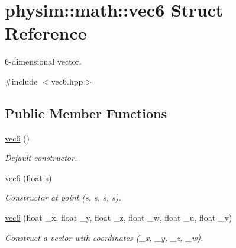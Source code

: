 \hypertarget{structphysim_1_1math_1_1vec6}{}\section{physim\+:\+:math\+:\+:vec6 Struct Reference}
\label{structphysim_1_1math_1_1vec6}


6-\/dimensional vector.  




{\ttfamily \#include $<$vec6.\+hpp$>$}

\subsection*{Public Member Functions}
\begin{DoxyCompactItemize}
\item 
\mbox{\label{structphysim_1_1math_1_1vec6_a94ae3ab411cd831ded39714a1b5a7f34}} 
\hyperlink{structphysim_1_1math_1_1vec6_a94ae3ab411cd831ded39714a1b5a7f34}{vec6} ()
\begin{DoxyCompactList}\small\item\em Default constructor. \end{DoxyCompactList}\item 
\mbox{\label{structphysim_1_1math_1_1vec6_a56e639bc621129c8f06d6f9ca2ac6d97}} 
\hyperlink{structphysim_1_1math_1_1vec6_a56e639bc621129c8f06d6f9ca2ac6d97}{vec6} (float s)
\begin{DoxyCompactList}\small\item\em Constructor at point ({\itshape s}, {\itshape s}, {\itshape s}, {\itshape s}). \end{DoxyCompactList}\item 
\mbox{\label{structphysim_1_1math_1_1vec6_a9fb7628762baef86b9683c0957215b2d}} 
\hyperlink{structphysim_1_1math_1_1vec6_a9fb7628762baef86b9683c0957215b2d}{vec6} (float \+\_\+x, float \+\_\+y, float \+\_\+z, float \+\_\+w, float \+\_\+u, float \+\_\+v)
\begin{DoxyCompactList}\small\item\em Construct a vector with coordinates ({\itshape \+\_\+x}, {\itshape \+\_\+y}, {\itshape \+\_\+z}, {\itshape \+\_\+w}). \end{DoxyCompactList}\item 

\end{DoxyCompactItemize}
